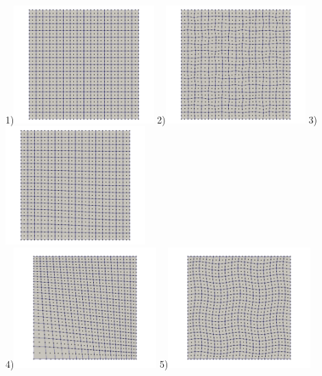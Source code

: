 \begin{center}
1)\includegraphics[width=5.4cm]{python_codes/fieldstone_76/results/mesh_type1}
2)\includegraphics[width=5.4cm]{python_codes/fieldstone_76/results/mesh_type2}
3)\includegraphics[width=5.4cm]{python_codes/fieldstone_76/results/mesh_type3}\\
4)\includegraphics[width=5.5cm]{python_codes/fieldstone_76/results/mesh_type4}
5)\includegraphics[width=5.5cm]{python_codes/fieldstone_76/results/mesh_type5}

\end{center}
